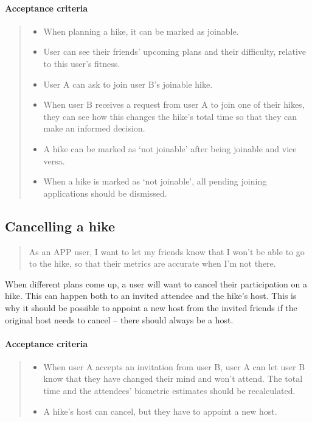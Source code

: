 \paragraph*{Acceptance criteria}
\begin{quote}
\begin{itemize}
    \item When planning a hike, it can be marked as joinable.
    \item User can see their friends' upcoming plans and their difficulty, relative to this user's fitness.
    \item User A can ask to join user B's joinable hike.
    \item When user B receives a request from user A to join one of their hikes, they can see how this changes the hike's total time so that they can make an informed decision.
    \item A hike can be marked as `not joinable' after being joinable and vice versa.
    \item When a hike is marked as `not joinable', all pending joining applications should be dismissed.
\end{itemize}
\end{quote}

\subsection{Cancelling a hike}\label{US:friends-cancel-hike}
\begin{quote}
As an APP user, I want to let my friends know that I won't be able to go to the hike, so that their metrics are accurate when I'm not there.
\end{quote}

When different plans come up, a user will want to cancel their participation on a hike.
This can happen both to an invited attendee and the hike's host.
This is why it should be possible to appoint a new host from the invited friends if the original host needs to cancel -- there should always be a host.

\paragraph*{Acceptance criteria}
\begin{quote}
\begin{itemize}
    \item When user A accepts an invitation from user B, user A can let user B know that they have changed their mind and won't attend. The total time and the attendees' biometric estimates should be recalculated.
    \item A hike's host can cancel, but they have to appoint a new host.
\end{itemize}
\end{quote}

